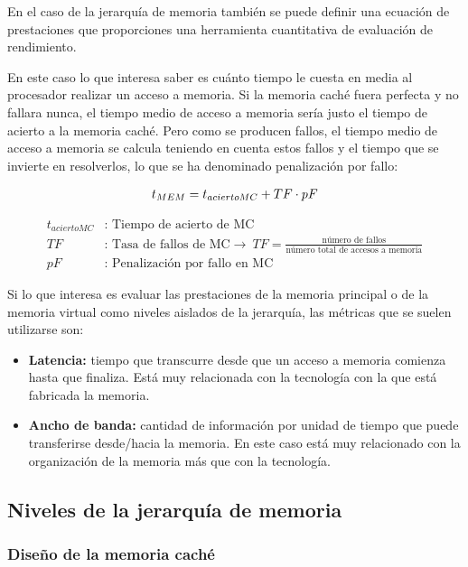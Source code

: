 En el caso de la jerarquía de memoria también se puede definir una ecuación de prestaciones que proporciones una herramienta cuantitativa de evaluación de rendimiento.

En este caso lo que interesa saber es cuánto tiempo le cuesta en media al procesador realizar un acceso a memoria. Si la memoria caché fuera perfecta y no fallara nunca, el tiempo medio de acceso a memoria sería justo el tiempo de acierto a la memoria caché. Pero como se producen fallos, el tiempo medio de acceso a memoria se calcula teniendo en cuenta estos fallos y el tiempo que se invierte en resolverlos, lo que se ha denominado penalización por fallo:

\begin{align*}
  \centering
  t_{MEM} = t_{acierto MC} + TF \cdot pF 
\end{align*}

\begin{align*}
  t_{acierto MC}&\text{: Tiempo de acierto de MC} \\
  TF&\text{: Tasa de fallos de MC} \to\ TF = \frac{\text{número de fallos}}{\text{número total de accesos a memoria}} \\
  pF&\text{: Penalización por fallo en MC}
\end{align*}

Si lo que interesa es evaluar las prestaciones de la memoria principal o de la memoria virtual como niveles aislados de la jerarquía, las métricas que se suelen utilizarse son:

\begin{itemize}
  \item \textbf{Latencia:} tiempo que transcurre desde que un acceso a memoria comienza hasta que finaliza. Está muy relacionada con la tecnología con la que está fabricada la memoria.
  \item \textbf{Ancho de banda:} cantidad de información por unidad de tiempo que puede transferirse desde/hacia la memoria. En este caso está muy relacionado con la organización de la memoria más que con la tecnología.
\end{itemize}


\subsection{Niveles de la jerarquía de memoria}

\subsubsection{Diseño de la memoria caché}

